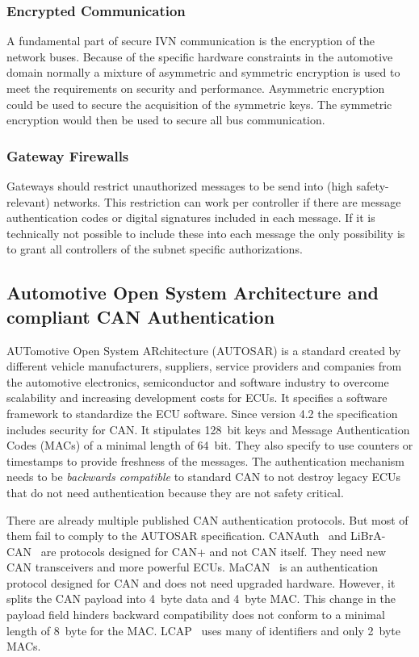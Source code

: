 \subsubsection{Encrypted Communication}

A fundamental part of secure IVN communication is the encryption of the network
buses. Because of the specific hardware constraints in the automotive domain
normally a mixture of asymmetric and symmetric encryption is used to meet the
requirements on security and performance. Asymmetric encryption could be used to
secure the acquisition of the symmetric keys. The symmetric encryption would
then be used to secure all bus communication.

\subsubsection{Gateway Firewalls}

Gateways should restrict unauthorized messages to be send into (high
safety-relevant) networks. This restriction can work per controller if there are
message authentication codes or digital signatures included in each message. If
it is technically not possible to include these into each message the only
possibility is to grant all controllers of the subnet specific authorizations.

\subsection{Automotive Open System Architecture and compliant CAN Authentication} 

AUTomotive Open System ARchitecture (AUTOSAR) is a standard created by different
vehicle manufacturers, suppliers, service providers and companies from the
automotive electronics, semiconductor and software industry to overcome
scalability and increasing development costs for ECUs. It specifies a software
framework to standardize the ECU software. Since version 4.2 the specification
includes security for CAN\@. It stipulates 128~bit keys and Message
Authentication Codes (MACs) of a minimal length of 64~bit. They also specify to
use counters or timestamps to provide freshness of the messages. The authentication mechanism needs to be \textit{backwards compatible} to standard CAN to not destroy legacy ECUs that do not need authentication because they are not safety critical.

There are already multiple published CAN authentication protocols. But most of
them fail to comply to the AUTOSAR specification. CANAuth~\cite{Herrewege2011} and LiBrA-CAN~\cite{Groza2012} are protocols designed for CAN+ and not CAN itself. They need new CAN transceivers and more powerful ECUs. MaCAN~\cite{Bruni2014} is an authentication protocol designed for CAN and does not need upgraded hardware. However, it splits the CAN payload into 4~byte data and 4~byte MAC\@. This change in the payload field hinders backward compatibility does not conform to a minimal length of 8~byte for the MAC. LCAP~\cite{Hazem2012} uses many of identifiers and only 2~byte MACs. 

